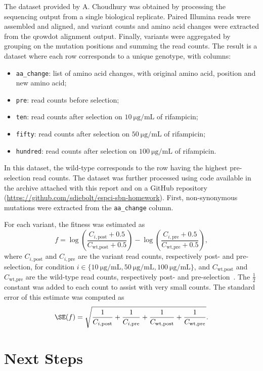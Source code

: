 \documentclass[12pt]{article}
\begin{document}
  The dataset provided by A. Choudhury was obtained by processing the
  sequencing output from a single biological replicate. Paired Illumina reads
  were assembled and aligned, and variant counts and amino acid changes were
  extracted from the qrowdot alignment output. Finally, variants were
  aggregated by grouping on the mutation positions and summing the read counts.
  The result is a dataset where each row corresponds to a unique genotype, with
  columns:
  \begin{itemize}
    \item \lstinline{aa_change}: list of amino acid changes, with original
      amino acid, position and new amino acid;
    \item \lstinline{pre}: read counts before selection;
    \item \lstinline{ten}: read counts after selection on 
      $\SI{10}{\micro\gram\per\milli\liter}$ of rifampicin;
    \item \lstinline{fifty}: read counts after selection on 
      $\SI{50}{\micro\gram\per\milli\liter}$ of rifampicin; 
    \item \lstinline{hundred}: read counts after selection on 
      $\SI{100}{\micro\gram\per\milli\liter}$ of rifampicin. 
  \end{itemize}

  In this dataset, the wild-type corresponds to the row having the highest
  pre-selection read counts. The dataset was further processed using code
  available in the archive attached with this report and on a GitHub repository
  (\url{https://github.com/sdiebolt/espci-sbn-homework}). First, non-synonymous
  mutations were extracted from the \lstinline{aa_change} column. 

  For each variant, the fitness was estimated as 
  \begin{equation}
    f = \log\left(\frac{C_{i, \text{post}} + 0.5}{C_{\text{wt}, \text{post}} +
    0.5}\right) - 
    \log\left(\frac{C_{i, \text{pre}} + 0.5}{C_{\text{wt}, \text{pre}} +
    0.5}\right),
  \end{equation}
  where $C_{i, \text{post}}$ and $C_{i, \text{pre}}$ are the variant read
  counts, respectively post- and pre-selection, for condition
  $i\in\{\SI{10}{\micro\gram\per\milli\liter},
  \SI{50}{\micro\gram\per\milli\liter},
  \SI{100}{\micro\gram\per\milli\liter}\}$, and $C_{\text{wt}, \text{post}}$
  and $C_{\text{wt}, \text{pre}}$ are the wild-type read counts, respectively
  post- and pre-selection~\cite{rubin2017}. The $\frac{1}{2}$ constant was
  added to each count to assist with very small counts. The standard error of
  this estimate was computed as
  \begin{equation}
    \SE(f) = \sqrt{\frac{1}{C_{i, \text{post}}} + \frac{1}{C_{i, \text{pre}}} +
    \frac{1}{C_{\text{wt}, \text{post}}} + \frac{1}{C_{\text{wt},
    \text{pre}}}}.
  \end{equation}

  \section*{Next Steps}



  \newpage

  
  
\end{document}
